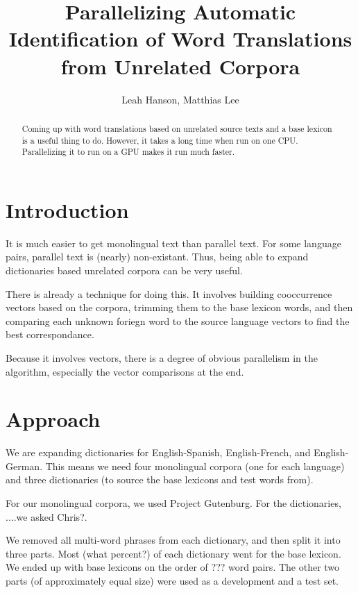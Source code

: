 \documentclass[12pt]{article}
\title{Parallelizing Automatic Identification of Word Translations from Unrelated Corpora}
\author{Leah Hanson, Matthias Lee}
\begin{document}
\maketitle
\begin{abstract}

Coming up with word translations based on unrelated source texts and a base
lexicon is a useful thing to do. However, it takes a long time when run on one
CPU. Parallelizing it to run on a GPU makes it run much faster.

\end{abstract}
\section{Introduction}

It is much easier to get monolingual text than parallel text. For some
language pairs, parallel text is (nearly) non-existant. Thus, being able to
expand dictionaries based unrelated corpora can be very useful.

There is already a technique for doing this. It involves building cooccurrence
vectors based on the corpora, trimming them to the base lexicon words, and
then comparing each unknown foriegn word to the source language vectors to
find the best correspondance.

Because it involves vectors, there is a degree of obvious parallelism in the
algorithm, especially the vector comparisons at the end.

\section{Approach}

We are expanding dictionaries for English-Spanish, English-French, and English-
German. This means we need four monolingual corpora (one for each language) and
three dictionaries (to source the base lexicons and test words from).

For our monolingual corpora, we used Project Gutenburg. For the dictionaries,
....we asked Chris?.


We removed all multi-word phrases from each dictionary, and then split it into
three parts. Most (what percent?) of each dictionary went for the base lexicon.
We ended up with base lexicons on the order of ??? word pairs. The other two
parts (of approximately equal size) were used as a development and a test set.
\end{document}
